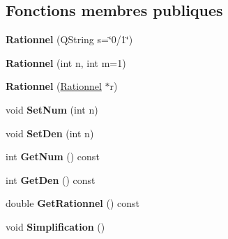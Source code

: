 \subsection*{Fonctions membres publiques}
\begin{DoxyCompactItemize}
\item 
\hypertarget{class_calcul_1_1_rationnel_ac00a14054204cc5ea425c13ca6b68f8a}{{\bfseries Rationnel} (Q\-String s=\char`\"{}0/1\char`\"{})}\label{class_calcul_1_1_rationnel_ac00a14054204cc5ea425c13ca6b68f8a}

\item 
\hypertarget{class_calcul_1_1_rationnel_a9591906d6ed8040bf476afd8664cf29b}{{\bfseries Rationnel} (int n, int m=1)}\label{class_calcul_1_1_rationnel_a9591906d6ed8040bf476afd8664cf29b}

\item 
\hypertarget{class_calcul_1_1_rationnel_a1864157c6d295746a860363f2fe49572}{{\bfseries Rationnel} (\hyperlink{class_calcul_1_1_rationnel}{Rationnel} $\ast$r)}\label{class_calcul_1_1_rationnel_a1864157c6d295746a860363f2fe49572}

\item 
\hypertarget{class_calcul_1_1_rationnel_af6012e3151fddb2b27c50234a24ed30c}{void {\bfseries Set\-Num} (int n)}\label{class_calcul_1_1_rationnel_af6012e3151fddb2b27c50234a24ed30c}

\item 
\hypertarget{class_calcul_1_1_rationnel_ad184a895103274c732df6011a7d7e395}{void {\bfseries Set\-Den} (int n)}\label{class_calcul_1_1_rationnel_ad184a895103274c732df6011a7d7e395}

\item 
\hypertarget{class_calcul_1_1_rationnel_a7ec6d7a179032dd0008d216b7043a2df}{int {\bfseries Get\-Num} () const }\label{class_calcul_1_1_rationnel_a7ec6d7a179032dd0008d216b7043a2df}

\item 
\hypertarget{class_calcul_1_1_rationnel_abd1a6579f6fddfc99560fe3f106c3801}{int {\bfseries Get\-Den} () const }\label{class_calcul_1_1_rationnel_abd1a6579f6fddfc99560fe3f106c3801}

\item 
\hypertarget{class_calcul_1_1_rationnel_a96d32671b363d958578bb0c72f3ea20c}{double {\bfseries Get\-Rationnel} () const }\label{class_calcul_1_1_rationnel_a96d32671b363d958578bb0c72f3ea20c}

\item 
\hypertarget{class_calcul_1_1_rationnel_a235c633052410be850cadc514f8a906b}{void {\bfseries Simplification} ()}\label{class_calcul_1_1_rationnel_a235c633052410be850cadc514f8a906b}


\end{DoxyCompactItemize}
